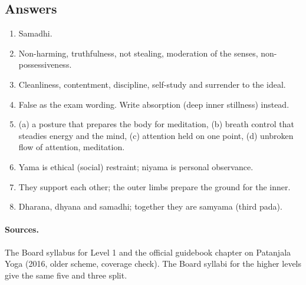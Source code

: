 \subsection*{Answers}
\begin{enumerate}
\item Samadhi.
\item Non-harming, truthfulness, not stealing, moderation of the senses, non-possessiveness.
\item Cleanliness, contentment, discipline, self-study and surrender to the ideal.
\item False as the exam wording. Write absorption (deep inner stillness) instead.
\item (a) a posture that prepares the body for meditation, (b) breath control that steadies energy and the mind, (c) attention held on one point, (d) unbroken flow of attention, meditation.
\item Yama is ethical (social) restraint; niyama is personal observance.
\item They support each other; the outer limbs prepare the ground for the inner.
\item Dharana, dhyana and samadhi; together they are samyama (third pada).
\end{enumerate}

\paragraph{Sources.} The Board syllabus for Level 1 and the official guidebook chapter on Patanjala Yoga (2016, older scheme, coverage check). The Board syllabi for the higher levels give the same five and three split.
